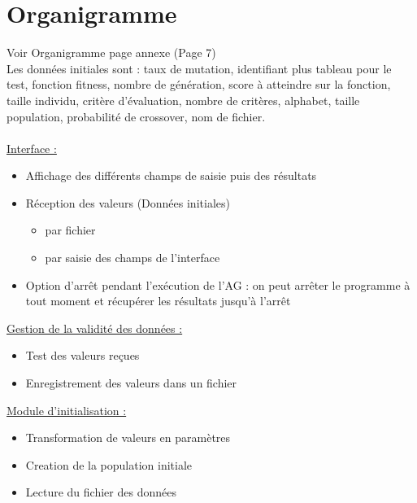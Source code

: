 \documentclass[a4paper,11pt]{article}
\begin{document}
	\section{Organigramme}
		Voir Organigramme page annexe (Page 7)\\
		Les données initiales sont : 	taux de mutation, 
										identifiant plus tableau pour le test, 
										fonction fitness, 
										nombre de génération, 
										score à atteindre sur la fonction, 
										taille individu, 
										critère d’évaluation, 
										nombre de critères, 
										alphabet, 
										taille population, probabilité de crossover, 
										nom de fichier.\\
		\\
		\underline{Interface :}
			\begin{itemize}
			\item Affichage des différents champs de saisie puis des résultats
			\item Réception des valeurs (Données initiales)
				\begin{itemize}
				\item par fichier
				\item par saisie des champs de l'interface
				\end{itemize}
			\item Option d’arrêt pendant l'exécution de l’AG : on peut arrêter le programme à tout moment et récupérer les résultats jusqu’à l’arrêt\\
			\end{itemize}
		
		\underline{Gestion de la validité des données : }
		\begin{itemize}
			\item Test des valeurs reçues
			\item Enregistrement des valeurs dans un fichier\\
		\end{itemize}
		
		\underline{Module d'initialisation : }
		\begin{itemize}
			\item Transformation de valeurs en paramètres
			\item Creation de la population initiale
			\item Lecture du fichier des données\\
		\end{itemize}
	
\end{document}
